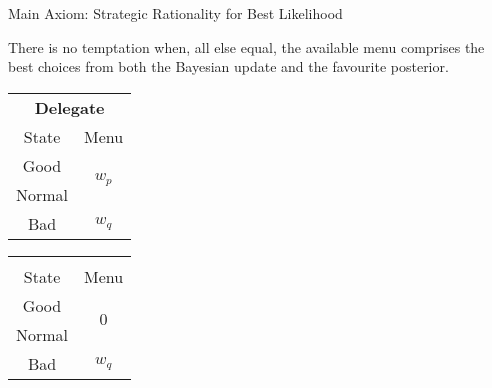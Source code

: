 \documentclass[usenames,dvipsnames,aspectratio=169,11pt, envcountsect, handout]{beamer}
\begin{document}
\begin{frame}[noframenumbering]{Main Axiom: Strategic Rationality for Best Likelihood}

	\begin{axiom}
		There is no temptation when, all else equal, the available menu comprises the best choices from both the Bayesian update and the favourite posterior.
	\end{axiom}

	\vfill

	\begin{table}[H]
		\centering
		\begin{minipage}{0.4\textwidth}
			\centering
			\begin{tabular}{c | c}
				\multicolumn{2}{c}{\textbf{Delegate}}                           \\
				State                & Menu                                     \\
				\hline
				{\color{blue}Good}   & \multirow{2}{*}{{\color{blue}\( w_p \)}} \\
				{\color{blue}Normal} &                                          \\
				Bad                  & \( w_q \)                                \\
			\end{tabular}
			\vspace{0.5cm} %
		\end{minipage}%
		\begin{minipage}{0.4\textwidth}
			\centering
			\begin{tabular}{c | c}
				\multicolumn{2}{c}{}                                          \\
				State                & Menu                                   \\
				\hline
				{\color{blue}Good}   & \multirow{2}{*}{{\color{blue}\( 0 \)}} \\
				{\color{blue}Normal} &                                        \\
				Bad                  & \( w_q \)                              \\
			\end{tabular}
			\vspace{0.5cm} %
		\end{minipage} %
	\end{table}

	\begin{flushright}
		\hyperlink{srblapp}{}
	\end{flushright}

\end{frame}
\end{document}
